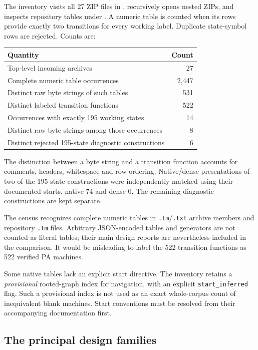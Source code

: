 \documentclass[10pt,letterpaper]{article}
\begin{document}
The inventory visits all 27 ZIP files in , recursively opens
nested ZIPs, and inspects repository tables under
. A numeric table is counted when its
rows provide exactly two transitions for every working label. Duplicate
state-symbol rows are rejected. Counts are:
\begin{center}
\begin{tabular}{@{}lr@{}}
\toprule
Quantity & Count\\\midrule
Top-level incoming archives & 27\\
Complete numeric table occurrences & 2,447\\
Distinct raw byte strings of such tables & 531\\
Distinct labeled transition functions & 522\\
Occurrences with exactly 195 working states & 14\\
Distinct raw byte strings among those occurrences & 8\\
Distinct rejected 195-state diagnostic constructions & 6\\
\bottomrule
\end{tabular}
\end{center}
The distinction between a byte string and a transition function accounts for
comments, headers, whitespace and row ordering. Native/dense presentations of
two of the 195-state constructions were independently matched using their
documented starts, native 74 and dense 0. The remaining diagnostic constructions
are kept separate.

The census recognizes complete numeric tables in \texttt{.tm}/\texttt{.txt}
archive members and repository \texttt{.tm} files. Arbitrary JSON-encoded tables
and generators are not counted as literal tables; their main design reports
are nevertheless included in the comparison. It would be misleading to label
the 522 transition functions as 522 verified PA machines.

Some native tables lack an explicit start directive. The inventory retains a
\emph{provisional} rooted-graph index for navigation, with an explicit
\texttt{start\_inferred} flag. Such a provisional index is not used as an exact
whole-corpus count of inequivalent blank machines. Start conventions must be
resolved from their accompanying documentation first.

\subsection{The principal design families}
\end{document}
